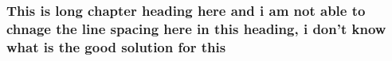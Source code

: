 \documentclass[10pt]{beamer}
\begin{document}
{
    \begin{frame}
    \frametitle{This is long chapter heading here and i am not able to chnage the line spacing here in this heading, i don't know what is the good solution for this}
    \end{frame}
}
\end{document}
